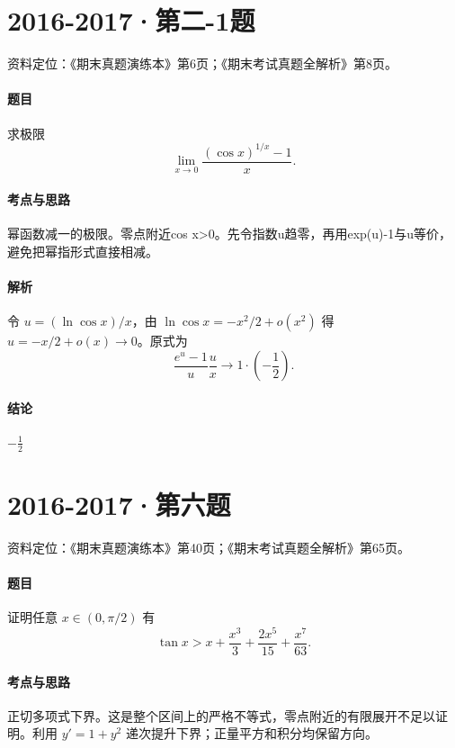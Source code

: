 \documentclass[UTF8,fontset=fandol,12pt,oneside,openany]{ctexrep}
\theoremstyle{definition}
\begin{document}
\par\addvspace{18pt}\noindent\begin{minipage}{\linewidth}
\section{2016-2017·第二-1题}
\label{exam:08:q19}
资料定位：《期末真题演练本》第6页；《期末考试真题全解析》第8页。
\paragraph{题目}
求极限 \[\lim_{x\to0}\frac{(\cos x)^{1/x}-1}{x}.\]
\end{minipage}\par
\paragraph{考点与思路}
幂函数减一的极限。零点附近cos x>0。先令指数u趋零，再用exp(u)-1与u等价，避免把幂指形式直接相减。
\paragraph{解析}
令 $u=(\ln\cos x)/x$，由 $\ln\cos x=-x^2/2+o(x^2)$ 得 $u=-x/2+o(x)\to0$。原式为 \[\frac{e^u-1}{u}\frac{u}{x}\longrightarrow1\cdot\left(-\frac12\right).\]
\paragraph{结论}
$-\frac12$

\par\addvspace{18pt}\noindent\begin{minipage}{\linewidth}
\section{2016-2017·第六题}
\label{exam:08:q20}
资料定位：《期末真题演练本》第40页；《期末考试真题全解析》第65页。
\paragraph{题目}
证明任意 $x\in(0,\pi/2)$ 有
\[\tan x>x+\frac{x^3}3+\frac{2x^5}{15}+\frac{x^7}{63}.\]
\end{minipage}\par
\paragraph{考点与思路}
正切多项式下界。这是整个区间上的严格不等式，零点附近的有限展开不足以证明。利用 $y'=1+y^2$ 递次提升下界；正量平方和积分均保留方向。
\end{document}
